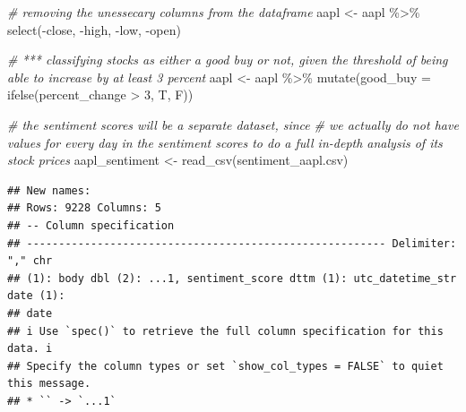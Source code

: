 \documentclass[
]{article}
\newenvironment{Shaded}{\begin{snugshade}}{\end{snugshade}}
\newcommand{\AttributeTok}[1]{\textcolor[rgb]{0.77,0.63,0.00}{#1}}
\newcommand{\CommentTok}[1]{\textcolor[rgb]{0.56,0.35,0.01}{\textit{#1}}}
\newcommand{\DecValTok}[1]{\textcolor[rgb]{0.00,0.00,0.81}{#1}}
\newcommand{\FunctionTok}[1]{\textcolor[rgb]{0.00,0.00,0.00}{#1}}
\newcommand{\NormalTok}[1]{#1}
\newcommand{\OtherTok}[1]{\textcolor[rgb]{0.56,0.35,0.01}{#1}}
\newcommand{\SpecialCharTok}[1]{\textcolor[rgb]{0.00,0.00,0.00}{#1}}
\newcommand{\StringTok}[1]{\textcolor[rgb]{0.31,0.60,0.02}{#1}}
\begin{document}
\begin{Shaded}
\begin{Highlighting}[]
\CommentTok{\# removing the unessecary columns from the dataframe}
\NormalTok{aapl }\OtherTok{\textless{}{-}}\NormalTok{ aapl }\SpecialCharTok{\%\textgreater{}\%}
  \FunctionTok{select}\NormalTok{(}\SpecialCharTok{{-}}\NormalTok{close, }\SpecialCharTok{{-}}\NormalTok{high, }\SpecialCharTok{{-}}\NormalTok{low, }\SpecialCharTok{{-}}\NormalTok{open)}

\CommentTok{\# *** classifying stocks as either a good buy or not, given the threshold of being able to increase by at least 3 percent}
\NormalTok{aapl }\OtherTok{\textless{}{-}}\NormalTok{ aapl }\SpecialCharTok{\%\textgreater{}\%}
  \FunctionTok{mutate}\NormalTok{(}\AttributeTok{good\_buy =} \FunctionTok{ifelse}\NormalTok{(percent\_change }\SpecialCharTok{\textgreater{}} \DecValTok{3}\NormalTok{, T, F))}


\CommentTok{\# the sentiment scores will be a separate dataset, since}
\CommentTok{\# we actually do not have values for every day in the sentiment scores to do a full in{-}depth analysis of its stock prices}
\NormalTok{aapl\_sentiment }\OtherTok{\textless{}{-}} \FunctionTok{read\_csv}\NormalTok{(}\StringTok{\textquotesingle{}sentiment\_aapl.csv\textquotesingle{}}\NormalTok{)}
\end{Highlighting}
\end{Shaded}

\begin{verbatim}
## New names:
## Rows: 9228 Columns: 5
## -- Column specification
## -------------------------------------------------------- Delimiter: "," chr
## (1): body dbl (2): ...1, sentiment_score dttm (1): utc_datetime_str date (1):
## date
## i Use `spec()` to retrieve the full column specification for this data. i
## Specify the column types or set `show_col_types = FALSE` to quiet this message.
## * `` -> `...1`
\end{verbatim}
\end{document}
